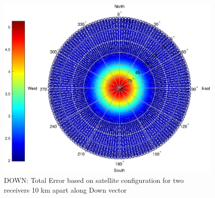 \begin{figure}
\centering
\caption{DOWN: Total Error based on satellite configuration for two receivers 10 km apart along Down vector}
\label{fig:plane_total_down_pow4}
\includegraphics[width=0.7\linewidth]{ChapterExperiments/Figures/plane_total_down_pow4}
\end{figure}

